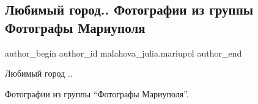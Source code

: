  
 
 
 
 

\subsection{Любимый город.. Фотографии из группы Фотографы Мариуполя}
\label{sec:26_12_2022.fb.malahova_julia.mariupol.1.lyubimii_gorod__foto}

\ifcmt
 author_begin
   author_id malahova_julia.mariupol
 author_end
\fi

Любимый город ..

Фотографии из группы  \enquote{Фотографы Мариуполя}.
